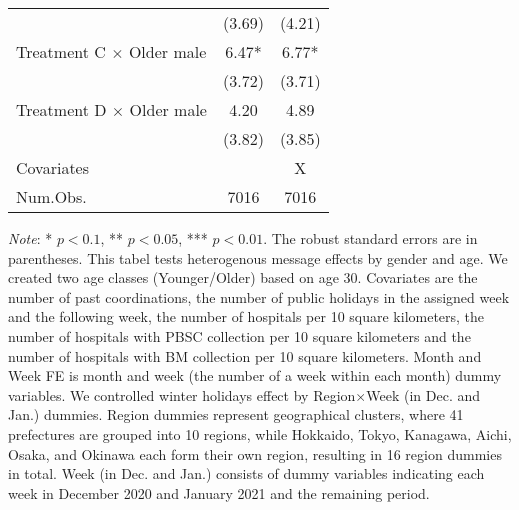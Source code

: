 \documentclass[12pt, a4paper]{article}
\begin{document}
\begin{table}[H]
\begin{threeparttable}
\begin{tabular}[t]{lcc}
 & (\num{3.69}) & (\num{4.21})\\
Treatment C $\times$ Older male & \num{6.47}* & \num{6.77}*\\
 & (\num{3.72}) & (\num{3.71})\\
Treatment D $\times$ Older male & \num{4.20} & \num{4.89}\\
 & (\num{3.82}) & (\num{3.85})\\
\midrule
Covariates &  & X\\
Num.Obs. & \num{7016} & \num{7016}\\
\bottomrule
\end{tabular}
\begin{tablenotes}
\item \emph{Note}: * $p < 0.1$, ** $p < 0.05$, *** $p < 0.01$. The robust standard errors are in parentheses. This tabel tests heterogenous message effects by gender and age. We created two age classes (Younger/Older) based on age 30. Covariates are the number of past coordinations, the number of public holidays in the assigned week and the following week, the number of hospitals per 10 square kilometers, the number of hospitals with PBSC collection per 10 square kilometers and the number of hospitals with BM collection per 10 square kilometers. Month and Week FE is month and week (the number of a week within each month) dummy variables. We controlled winter holidays effect by Region$\times$Week (in Dec. and Jan.) dummies. Region dummies represent geographical clusters, where 41 prefectures are grouped into 10 regions, while Hokkaido, Tokyo, Kanagawa, Aichi, Osaka, and Okinawa each form their own region, resulting in 16 region dummies in total. Week (in Dec. and Jan.) consists of dummy variables indicating each week in December 2020 and January 2021 and the remaining period.
\end{tablenotes}
\end{threeparttable}
\end{table}
\end{document}
